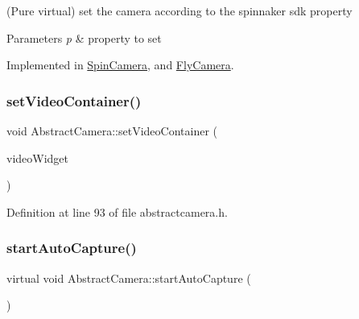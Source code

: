 (Pure virtual) set the camera according to the spinnaker sdk property 


\begin{DoxyParams}{Parameters}
{\em p} & property to set \\
\hline
\end{DoxyParams}


Implemented in \mbox{\hyperlink{class_spin_camera_abb8eddf9373bf488a8eaa87b117d40c0}{Spin\+Camera}}, and \mbox{\hyperlink{class_fly_camera_a5d3b0d4395ec7654e34d56d7f13a541a}{Fly\+Camera}}.

\mbox{\label{class_abstract_camera_a5320bb45065833d441811d2273bfce64}} 
\subsubsection{\texorpdfstring{setVideoContainer()}{setVideoContainer()}}
{\footnotesize\ttfamily void Abstract\+Camera\+::set\+Video\+Container (\begin{DoxyParamCaption}\item[{\mbox{\hyperlink{class_video_open_g_l_widget}{Video\+Open\+G\+L\+Widget}} $\ast$}]{video\+Widget }\end{DoxyParamCaption})\hspace{0.3cm}{\ttfamily [inline]}}



Definition at line 93 of file abstractcamera.\+h.

\mbox{\label{class_abstract_camera_a2f47d9877c5308856f42c94723faca33}} 
\subsubsection{\texorpdfstring{startAutoCapture()}{startAutoCapture()}}
{\footnotesize\ttfamily virtual void Abstract\+Camera\+::start\+Auto\+Capture (\begin{DoxyParamCaption}{ }\end{DoxyParamCaption})\hspace{0.3cm}{\ttfamily [pure virtual]}}



